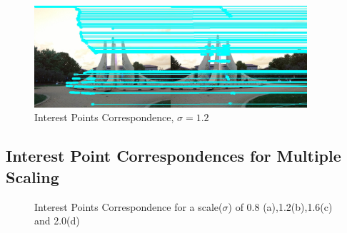 \documentclass{article}
\begin{document}
\begin{figure}[!htbp]
     \centering
    \includegraphics[width=0.9\textwidth]{../Image_Correspondences_SSD_fountain_1.2.jpg}
    \caption{Interest Points Correspondence, $\sigma=1.2$}
\end{figure}
\newpage
\subsection{Interest Point Correspondences for Multiple Scaling}
\begin{figure}[!htbp]
     \centering
    \captionsetup[subfigure]{labelformat=empty}
    \caption{Interest Points Correspondence for a scale($\sigma$) of 0.8 (a),1.2(b),1.6(c) and 2.0(d)}
\end{figure}
\end{document}
